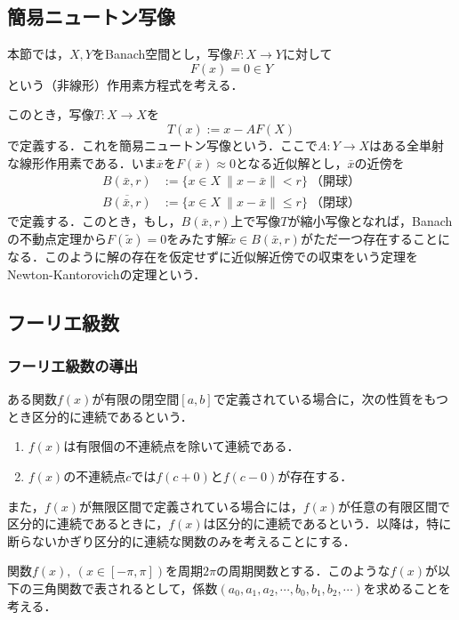 \documentclass[11pt,a4paper]{jsarticle}
\theoremstyle{definition}
\begin{document}
\subsection{簡易ニュートン写像}
本節では，$X,Y$をBanach空間とし，写像$F:X\rightarrow Y$に対して
\begin{equation*}
  F(x)=0 \in Y
\end{equation*}
という（非線形）作用素方程式を考える．

このとき，写像$T:X\rightarrow X$を
\begin{equation*}
  T(x):=x-AF(X)
\end{equation*}
で定義する．これを簡易ニュートン写像という．ここで$A:Y\rightarrow X$はある全単射な線形作用素である．いま$\bar{x}$を$F(\bar{x})\approx 0$となる近似解とし，$\bar{x}$の近傍を
\begin{align*}
  B(\bar{x},r)            & :=\{x\in X\:\|x-\bar{x}\|<r\}\ （開球）     \\
  \overline{B(\bar{x},r)} & :=\{x\in X\:\|x-\bar{x}\|\leq r\}\ （閉球）
\end{align*}
で定義する．このとき，もし，$B(\bar{x},r)$上で写像$T$が縮小写像となれば，Banachの不動点定理から$F(\tilde{x})=0$をみたす解$\tilde{x}\in B(\bar{x},r)$がただ一つ存在することになる．このように解の存在を仮定せずに近似解近傍での収束をいう定理をNewton-Kantorovichの定理という．

\subsection{フーリエ級数}
\subsubsection{フーリエ級数の導出}
ある関数$f(x)$が有限の閉空間$[a,b]$で定義されている場合に，次の性質をもつとき区分的に連続であるという．
\begin{enumerate}
  \item $f(x)$は有限個の不連続点を除いて連続である．
  \item $f(x)$の不連続点$c$では$f(c+0)$と$f(c-0)$が存在する．
\end{enumerate}

また，$f(x)$が無限区間で定義されている場合には，$f(x)$が任意の有限区間で区分的に連続であるときに，$f(x)$は区分的に連続であるという．以降は，特に断らないかぎり区分的に連続な関数のみを考えることにする．

関数$f(x),\ (x\in [-\pi,\pi])$を周期$2\pi$の周期関数とする．このような$f(x)$が以下の三角関数で表されるとして，係数$(a_0,a_1,a_2,\cdots,b_0,b_1,b_2,\cdots)$を求めることを考える．
\end{document}
